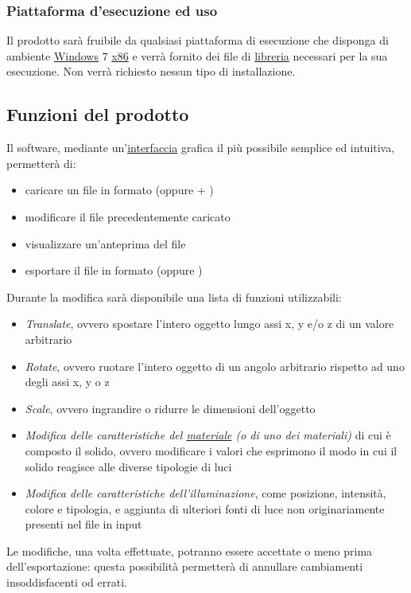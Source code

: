 \subsubsection{Piattaforma d'esecuzione ed uso} %
\label{2.1.2}
Il prodotto sarà fruibile da qualsiasi piattaforma di esecuzione che disponga di ambiente \underline{Windows} 7 \underline{x86} e verrà fornito dei file di \underline{libreria} necessari per la sua esecuzione. Non verrà richiesto nessun tipo di installazione.
\subsection{Funzioni del prodotto} %
\label{2.2}
Il software, mediante un'\underline{interfaccia} grafica il più possibile semplice ed intuitiva, permetterà di:
\begin{itemize}
\item caricare un file in formato \treds{} (oppure{} \obj{} + \mtl)
\item modificare il file precedentemente caricato
\item visualizzare un'anteprima del file
\item esportare il file in formato \json{} (oppure {}\xml)
\end{itemize}
Durante la modifica sarà disponibile una lista di funzioni utilizzabili:
\begin{itemize}
\item \emph{Translate}, ovvero spostare l'intero oggetto lungo assi x, y e/o z di un valore arbitrario
\item \emph{Rotate}, ovvero ruotare l'intero oggetto di un angolo arbitrario rispetto ad uno degli assi x, y o z
\item \emph{Scale}, ovvero ingrandire o ridurre le dimensioni dell'oggetto
\item \emph{Modifica delle caratteristiche del \underline{materiale} (o di uno dei materiali)} di cui è composto il solido, ovvero modificare i valori che esprimono il modo in cui il solido reagisce alle diverse tipologie di luci
\item \emph{Modifica delle caratteristiche dell'illuminazione}, come posizione, intensità, colore e tipologia, e aggiunta di ulteriori fonti di luce non originariamente presenti nel file in input
\end{itemize}
Le modifiche, una volta effettuate, potranno essere accettate o meno prima dell'esportazione: questa possibilità permetterà di annullare cambiamenti insoddisfacenti od errati. \\
